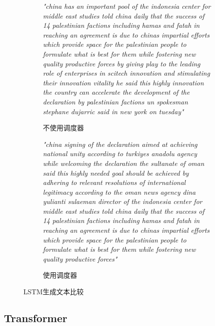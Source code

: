 \begin{figure}[H]
    \centering
    \begin{subfigure}[b]{0.45\textwidth}
        \textit{"china has an important pool of the indonesia center for middle east studies told china daily that the success of 14 palestinian factions including hamas and fatah in reaching an agreement is due to chinas impartial efforts which provide space for the palestinian people to formulate what is best for them while fostering new quality productive forces by giving play to the leading role of enterprises in scitech innovation and stimulating their innovation vitality he said this highly innovation the country can accelerate the development of the declaration by palestinian factions un spokesman stephane dujarric said in new york on tuesday"}
        \caption{不使用调度器}
        \label{fig:lstmtextnoscheduler}
    \end{subfigure}
    \hfill
    \begin{subfigure}[b]{0.45\textwidth}
        \textit{"china signing of the declaration aimed at achieving national unity according to turkiyes anadolu agency while welcoming the declaration the sultanate of oman said this highly needed goal should be achieved by adhering to relevant resolutions of international legitimacy according to the oman news agency dina yulianti sulaeman director of the indonesia center for middle east studies told china daily that the success of 14 palestinian factions including hamas and fatah in reaching an agreement is due to chinas impartial efforts which provide space for the palestinian people to formulate what is best for them while fostering new quality productive forces"}
        \caption{使用调度器}
        \label{fig:lstmtextwithscheduler}
    \end{subfigure}
    \caption{LSTM生成文本比较}
    \label{fig:lstmtext-comparison}
\end{figure}

\subsection{Transformer}

